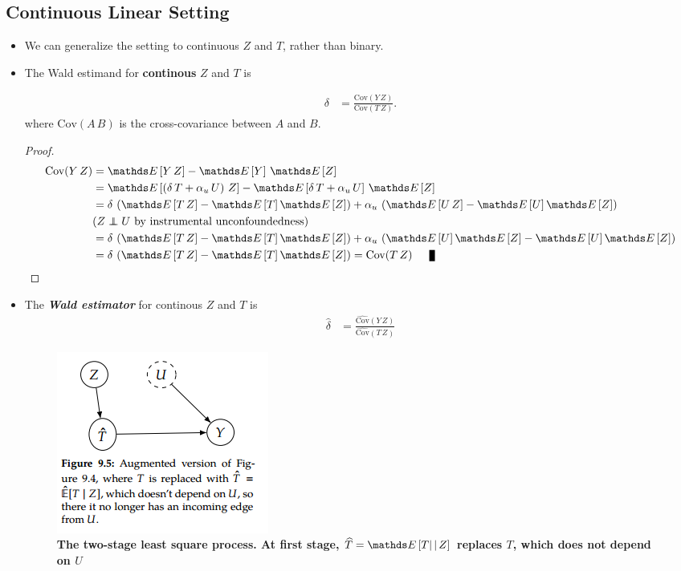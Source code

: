 \documentclass[11pt]{article}
\begin{document}
\subsection{Continuous Linear Setting}
\begin{itemize}
\item We can generalize the setting to continuous $Z$ and $T$, rather than binary. 
\item The Wald estimand for \textbf{continous} $Z$ and $T$ is 
\begin{proposition}
\begin{align}
\delta &= \frac{\text{Cov}(Y\,Z)}{\text{Cov}(T\,Z)}. \label{eqn: wald_est_cont}
\end{align} where $\text{Cov}(A\,B)$ is the cross-covariance between $A$ and $B$.
\end{proposition}
\begin{proof}
\begin{align*}
\text{Cov}(Y\,Z) &= \E{}{Y\,Z} - \E{}{Y}\,\E{}{Z} \\
&= \E{}{\paren{\delta\,T + \alpha_{u}\, U} \,Z} - \E{}{\delta\,T + \alpha_{u}\, U}\,\E{}{Z} \\
&= \delta\,\paren{\E{}{T\,Z} - \E{}{T}\E{}{Z}}+ \alpha_u\,\paren{\E{}{U\,Z} - \E{}{U}\E{}{Z}}\\
& (Z \indep U \text{ by instrumental unconfoundedness}) \\
&= \delta\,\paren{\E{}{T\,Z} - \E{}{T}\E{}{Z}}+ \alpha_u\,\paren{\E{}{U}\E{}{Z} - \E{}{U}\E{}{Z}}\\
&= \delta\,\paren{\E{}{T\,Z} - \E{}{T}\E{}{Z}} = \text{Cov}(T\,Z) \qed
\end{align*}
\end{proof}

\item The \emph{\textbf{Wald estimator}} for continous $Z$ and $T$ is
\begin{align}
\hat{\delta} &= \frac{\widehat{\text{Cov}}(Y\,Z) }{\widehat{\text{Cov}}(T\,Z) } \label{eqn: wald_stats_cont}
\end{align}

\begin{figure}
\begin{minipage}[t]{1\linewidth}
  \centering
  \centerline{\includegraphics[scale = 0.6]{two_stage_ls.png}}
\end{minipage}
\caption{\footnotesize{\textbf{The two-stage least square process. At first stage, $\widehat{T} = \E{}{T|\,|\,Z}$ replaces $T$, which does not depend on $U$ \citep{neal2020introduction}}}}
\label{fig: two_stage_ls}
\end{figure}




\end{itemize}
\end{document}
